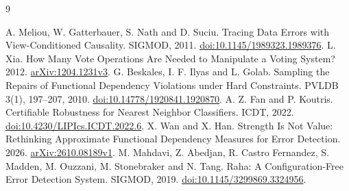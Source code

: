 \documentclass[11pt]{article}
\begin{document}
\begin{thebibliography}{9}
\raggedright
{} A. Meliou, W. Gatterbauer, S. Nath and D. Suciu.
Tracing Data Errors with View-Conditioned Causality. SIGMOD, 2011.
\href{https://doi.org/10.1145/1989323.1989376}{doi:10.1145/1989323.1989376}.
 L. Xia. How Many Vote Operations Are Needed to Manipulate a
Voting System? 2012. \href{https://arxiv.org/abs/1204.1231v3}{arXiv:1204.1231v3}.
 G. Beskales, I. F. Ilyas and L. Golab. Sampling the Repairs
of Functional Dependency Violations under Hard Constraints. PVLDB 3(1),
197--207, 2010. \href{https://doi.org/10.14778/1920841.1920870}{doi:10.14778/1920841.1920870}.
 A. Z. Fan and P. Koutris. Certifiable Robustness for Nearest
Neighbor Classifiers. ICDT, 2022.
\href{https://doi.org/10.4230/LIPIcs.ICDT.2022.6}{doi:10.4230/LIPIcs.ICDT.2022.6}.
 X. Wan and X. Han. Strength Is Not Value: Rethinking Approximate
Functional Dependency Measures for Error Detection. 2026.
\href{https://arxiv.org/abs/2610.08189v1}{arXiv:2610.08189v1}.
 M. Mahdavi, Z. Abedjan, R. Castro Fernandez, S. Madden,
M. Ouzzani, M. Stonebraker and N. Tang. Raha: A Configuration-Free Error
Detection System. SIGMOD, 2019.
\href{https://doi.org/10.1145/3299869.3324956}{doi:10.1145/3299869.3324956}.
\end{thebibliography}
\end{document}
